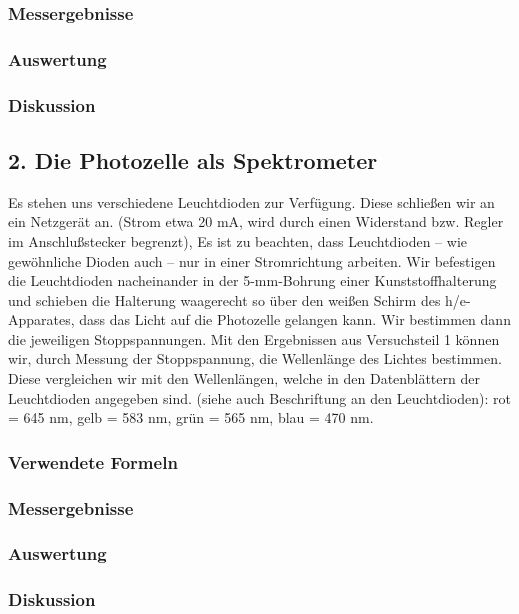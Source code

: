 \documentclass[12px]{scrartcl}
\begin{document}
\subsubsection{Messergebnisse}
\subsubsection{Auswertung}
\subsubsection{Diskussion}

\subsection{2. Die Photozelle als Spektrometer}
Es stehen uns verschiedene Leuchtdioden zur Verfügung. Diese schließen wir an ein Netzgerät an.
(Strom etwa 20 mA, wird durch einen Widerstand bzw. Regler im Anschlußstecker begrenzt), Es ist zu beachten, dass Leuchtdioden -- wie gewöhnliche Dioden auch -- nur in einer Stromrichtung arbeiten.
Wir befestigen die Leuchtdioden nacheinander in der 5-mm-Bohrung einer Kunststoffhalterung und schieben die Halterung waagerecht so über den weißen Schirm des h/e-Apparates, dass das Licht auf die Photozelle gelangen kann. Wir bestimmen dann die jeweiligen Stoppspannungen.
Mit den Ergebnissen aus Versuchsteil 1 können wir, durch Messung der Stoppspannung, die Wellenlänge des Lichtes bestimmen. Diese vergleichen wir mit den Wellenlängen, welche in den Datenblättern der Leuchtdioden angegeben sind. (siehe auch Beschriftung an den Leuchtdioden):
rot = 645 nm, gelb = 583 nm, grün = 565 nm, blau = 470 nm.
\subsubsection{Verwendete Formeln}
\subsubsection{Messergebnisse}
\subsubsection{Auswertung}
\subsubsection{Diskussion}
\end{document}
